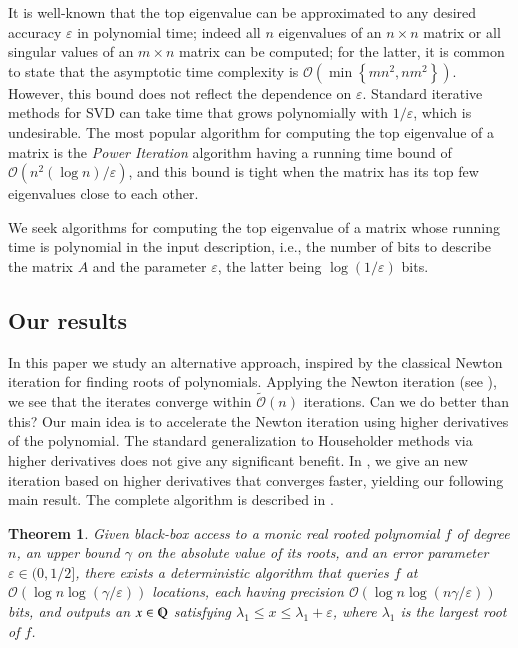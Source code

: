 \documentclass{article}[12pt]
\newtheorem{theorem}{Theorem}[section]
\theoremstyle{definition}
\renewcommand{\mathbb}{\varmathbb}
\renewcommand{\leq}{\leqslant}
\newcommand{\set}[1]{\left\{#1\right\}}
\newcommand{\Q}{\mathbb Q}
\newcommand{\e}{\epsilon}
\let\e\varepsilon
\newcommand{\bigO}{\mathcal{O}}
\newcommand{\bigo}[1]{\bigO\left(#1\right)}
\newcommand{\tbigO}{\tilde{\mathcal{O}}}
\newcommand{\tbigo}[1]{\tbigO\left(#1\right)}
\newcommand{\charp}{f}
\begin{document}
It is well-known that the top eigenvalue can be approximated to any desired accuracy 
$\e$ in polynomial time; indeed all $n$ eigenvalues of an $n \times n$ matrix or all singular values 
of an $m \times n$ matrix can be 
computed; for the latter, it is common to state that the asymptotic 
time complexity is $ \bigo{ \min \set{ mn^2, nm^2} }$. However, this 
bound does not reflect the dependence on $\e$. Standard iterative methods for SVD 
can take time that grows polynomially with $1/\e$, which is undesirable.
The most popular algorithm for computing the top eigenvalue of a matrix is the 
{\em Power Iteration} algorithm \cite{mp29} having a running time
bound of $\bigo{n^2 (\log n)/\e}$, and this bound is tight when the matrix has its top few 
eigenvalues close to each other.


We seek algorithms for computing the top eigenvalue of a matrix whose running time is polynomial  
in the input description, i.e., the number of bits to describe the matrix $A$ and 
the parameter $\e$, the latter being $\log (1/\e)$ bits.


\subsection{Our results}
In this paper
 we study an alternative approach, inspired by the classical Newton iteration for finding roots of polynomials. 
Applying the Newton iteration (see ), we see that the iterates converge 
within $\tbigo{n}$ iterations.  
Can we do better than this? Our main idea is to accelerate the Newton iteration using higher derivatives 
of the polynomial. The standard generalization 
to Householder methods via higher derivatives \cite{h70,or70} does not give any significant benefit. In , 
we give an new iteration based on higher derivatives that converges faster, 
yielding our following main result.
The complete algorithm is described in .
\begin{theorem}
\label{thm:poly-blackbox}
Given black-box access to a monic real rooted polynomial $\charp$ of degree $n$, an upper bound $\gamma$ 
on the absolute value of its roots,
and an error parameter $\e \in (0,1/2]$, there exists a deterministic algorithm that queries $\charp$
at $\bigo{\log n \log (\gamma/\e) }$ locations, 
each having precision $\bigo{ \log n \log (n\gamma/\e)}$ bits, 
and outputs an $x \in \Q$ satisfying
$\lambda_1 \leq x \leq \lambda_1 + \e$,
where $\lambda_1$ is the largest root of $\charp$. 
\end{theorem}
\end{document}
